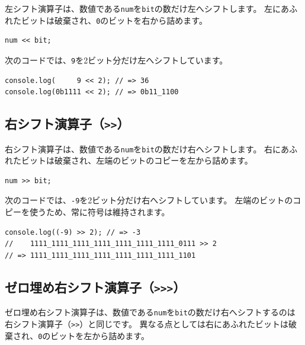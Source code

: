 左シフト演算子は、数値である\texttt{num}を\texttt{bit}の数だけ左へシフトします。
左にあふれたビットは破棄され、\texttt{0}のビットを右から詰めます。

\begin{lstlisting}
num << bit;
\end{lstlisting}

次のコードでは、\texttt{9}を2ビット分だけ左へシフトしています。

\begin{lstlisting}
console.log(     9 << 2); // => 36
console.log(0b1111 << 2); // => 0b11_1100
\end{lstlisting}

\hypertarget{right-shift}{%
\subsection{\texorpdfstring{右シフト演算子（\texttt{\textgreater{}\textgreater{}}）}{右シフト演算子（\textgreater{}\textgreater{}）}}\label{right-shift}}

右シフト演算子は、数値である\texttt{num}を\texttt{bit}の数だけ右へシフトします。
右にあふれたビットは破棄され、左端のビットのコピーを左から詰めます。

\begin{lstlisting}
num >> bit;
\end{lstlisting}

次のコードでは、\texttt{-9}を2ビット分だけ右へシフトしています。
左端のビットのコピーを使うため、常に符号は維持されます。

\begin{lstlisting}
console.log((-9) >> 2); // => -3
//    1111_1111_1111_1111_1111_1111_1111_0111 >> 2
// => 1111_1111_1111_1111_1111_1111_1111_1101
\end{lstlisting}

\hypertarget{fill-zero-right-shift}{%
\subsection{\texorpdfstring{ゼロ埋め右シフト演算子（\texttt{\textgreater{}\textgreater{}\textgreater{}}）}{ゼロ埋め右シフト演算子（\textgreater{}\textgreater{}\textgreater{}）}}\label{fill-zero-right-shift}}

ゼロ埋め右シフト演算子は、数値である\texttt{num}を\texttt{bit}の数だけ右へシフトするのは右シフト演算子（\lstinline{>>}）と同じです。
異なる点としては右にあふれたビットは破棄され、\texttt{0}のビットを左から詰めます。

